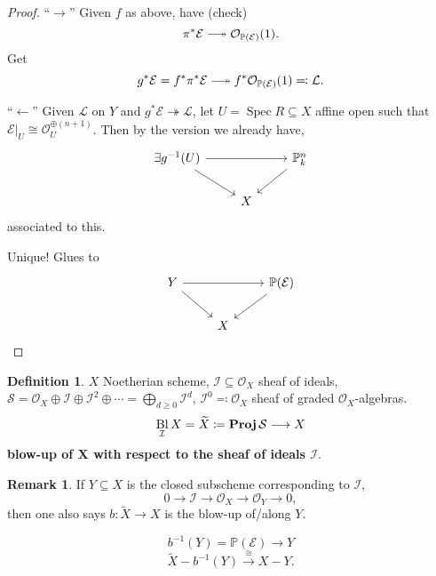 \documentclass[12pt]{article}
\DeclareMathOperator{\Spec}{Spec}
\DeclareMathOperator{\relProj}{\textnormal{\textbf{Proj}}}
\DeclareMathOperator{\Bl}{Bl}
\theoremstyle{definition}
\newtheorem*{definition}{Definition}
\newtheorem*{remark}{Remark}
\theoremstyle{remark}
\begin{document}
\begin{proof}
``$\rightarrow$'' Given $f$ as above, have (check)
\[\pi^*\mathcal{E}\relbar\joinrel\twoheadrightarrow\mathcal{O}_{\mathbb{P}(\mathcal{E})}(1).\]
Get
\[g^*\mathcal{E}=f^*\pi^*\mathcal{E}\relbar\joinrel\twoheadrightarrow f^*\mathcal{O}_{\mathbb{P}(\mathcal{E})}(1)\eqqcolon\mathcal{L}.\]

``$\leftarrow$'' Given $\mathcal{L}$ on $Y$ and $g^*\mathcal{E}\twoheadrightarrow\mathcal{L}$, let $U=\Spec R\subseteq X$ affine open such that $\mathcal{E}|_U\cong\mathcal{O}_U^{\oplus(n+1)}$. Then by the version we already have,
\[
\begin{tikzcd}
\exists g^{-1}(U)\arrow[rr]\arrow[rd]&&\mathbb{P}_k^n\arrow[ld]\\
&X
\end{tikzcd}
\]
associated to this.

Unique! Glues to
\[
\begin{tikzcd}
Y\arrow[rr]\arrow[rd]&&\mathbb{P}(\mathcal{E})\arrow[ld]\\
&X
\end{tikzcd}
\]
\end{proof}

\begin{definition}
$X$ Noetherian scheme, $\mathcal{I}\subseteq\mathcal{O}_X$ sheaf of ideals, $\mathcal{S}=\mathcal{O}_X\oplus\mathcal{I}\oplus\mathcal{I}^2\oplus\cdots=\bigoplus_{d\geq0}\mathcal{I}^d$, $\mathcal{I}^0\eqqcolon\mathcal{O}_X$ sheaf of graded $\mathcal{O}_X$-algebras.
\[\Bl_{\mathcal{I}}X=\widetilde{X}\coloneqq\relProj\mathcal{S}\longrightarrow X\]
\textbf{blow-up of $\boldsymbol{X}$ with respect to the sheaf of ideals $\boldsymbol{\mathcal{I}}$}.
\end{definition}

\begin{remark}
If $Y\subseteq X$ is the closed subscheme corresponding to $\mathcal{I}$,
\[0\longrightarrow\mathcal{I}\longrightarrow\mathcal{O}_X\longrightarrow\mathcal{O}_Y\longrightarrow0,\]
then one also says $b:\widetilde{X}\rightarrow X$ is the blow-up of/along $Y$.

\[b^{-1}(Y)=\mathbb{P}(\mathcal{E})\longrightarrow Y\]
\[\widetilde{X}-b^{-1}(Y)\overset{\cong}{\longrightarrow}X-Y.\]
\end{remark}
\end{document}
